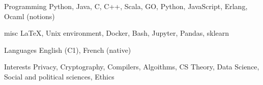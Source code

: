 


\begin{cvskills}


\cvskill
{Programming} %
{Python, Java, C, C++, Scala, GO, Python, JavaScript, Erlang, Ocaml (notions)} %


\cvskill
{misc} %
{\LaTeX, Unix environment, Docker, Bash, Jupyter, Pandas, sklearn} %


\cvskill
{Languages} %
{English (C1), French (native)} %


\cvskill
{Interests} %
{Privacy, Cryptography, Compilers, Algoithms, CS Theory, Data Science, Social and political sciences, Ethics} %


\end{cvskills}